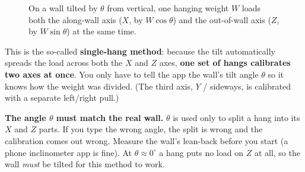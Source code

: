 \documentclass[11pt,a4paper]{article}
\begin{document}
\begin{figure}[H]
\centering
{}
\caption{On a wall tilted by $\theta$ from vertical, one hanging weight $W$ loads
both the along-wall axis ($X$, by $W\cos\theta$) and the out-of-wall axis ($Z$, by
$W\sin\theta$) at the same time.}
\label{fig:tilt}
\end{figure}

This is the so-called \textbf{single-hang method}: because the tilt automatically
spreads the load across both the $X$ and $Z$ axes, \textbf{one set of hangs
calibrates two axes at once}. You only have to tell the app the wall's tilt angle
$\theta$ so it knows how the weight was divided. (The third axis, $Y$ /
sideways, is calibrated with a separate left/right pull.)

\begin{warnbox}
\textbf{The angle $\theta$ must match the real wall.} $\theta$ is used only to
split a hang into its $X$ and $Z$ parts. If you type the wrong angle, the split is
wrong and the calibration comes out wrong. Measure the wall's lean-back before you
start (a phone inclinometer app is fine). At $\theta\approx 0^\circ$ a hang puts no
load on $Z$ at all, so the wall \emph{must} be tilted for this method to work.
\end{warnbox}
\end{document}
